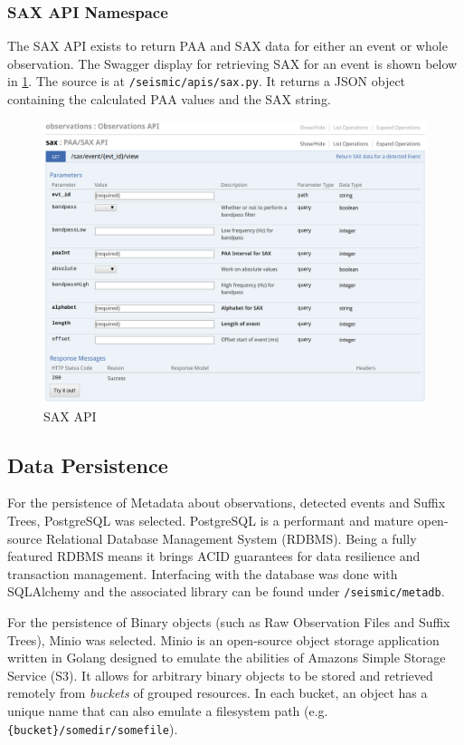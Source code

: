 \documentclass[../report.tex]{subfiles}
\begin{document}
\subsubsection*{SAX API Namespace}

	The SAX API exists to return PAA and SAX data for either an event or whole observation.  The Swagger display for retrieving SAX for an event is shown below in \cref{fig:sax-api}.  The source is at \texttt{/seismic/apis/sax.py}.  It returns a JSON object containing the calculated PAA values and the SAX string.

\begin{figure}[ht]
	\centering
	\includegraphics[width=1\linewidth]{img/sax-api}
	\caption{SAX API}
	\label{fig:sax-api}
\end{figure}

\subsection{Data Persistence} \label{sec:data-persistence}
	
	For the persistence of Metadata about observations, detected events and Suffix Trees, PostgreSQL was selected.  PostgreSQL is a performant and mature open-source Relational Database Management System (RDBMS).  Being a fully featured RDBMS means it brings ACID guarantees for data resilience and transaction management.  Interfacing with the database was done with SQLAlchemy and the associated library can be found under \texttt{/seismic/metadb}.
	
	For the persistence of Binary objects (such as Raw Observation Files and Suffix Trees), Minio was selected.  Minio is an open-source object storage application written in Golang designed to emulate the abilities of Amazons Simple Storage Service (S3).  It allows for arbitrary binary objects to be stored and retrieved remotely from \textit{buckets} of grouped resources.  In each bucket, an object has a unique name that can also emulate a filesystem path (e.g. \texttt{\{bucket\}/somedir/somefile}).
	
\end{document}
